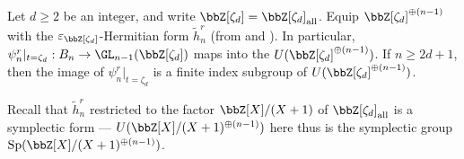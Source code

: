 \begin{theorem} \label{theorem:venkataramana_image_of_reduced_burau_at_roots_of_unity_is_arithmetic_group_full_ring}

    Let $d \geq 2$ be an integer, and write $\bbZ[\zeta_d] = \bbZ[\zeta_d]_{\text{all}}$. Equip $\bbZ[\zeta_d]^{\oplus (n-1)}$ with the $\varepsilon_{\bbZ[\zeta_d]}$-Hermitian form $\tilde{h}_n^r$ (from  and ). In particular, $\psi_n^r|_{t=\zeta_d}: B_n \to \GL_{n-1}(\bbZ[\zeta_d])$ maps into the  $U(\bbZ[\zeta_d]^{\oplus (n-1)})$. If $n \geq 2d+1$, then the image of $\psi_n^r|_{t=\zeta_d}$ is a finite index subgroup of $U(\bbZ[\zeta_d]^{\oplus (n-1)})$.
    \begin{remark}
        Recall that $\tilde{h}_n^r$ restricted to the factor $\bbZ[X]/(X+1)$ of $\bbZ[\zeta_d]_{\text{all}}$ is a symplectic form --- $U(\bbZ[X]/(X+1)^{\oplus(n-1)})$ here thus is the symplectic group $\mathrm{Sp}(\bbZ[X]/(X+1)^{\oplus (n-1)})$.
    \end{remark}
\end{theorem}